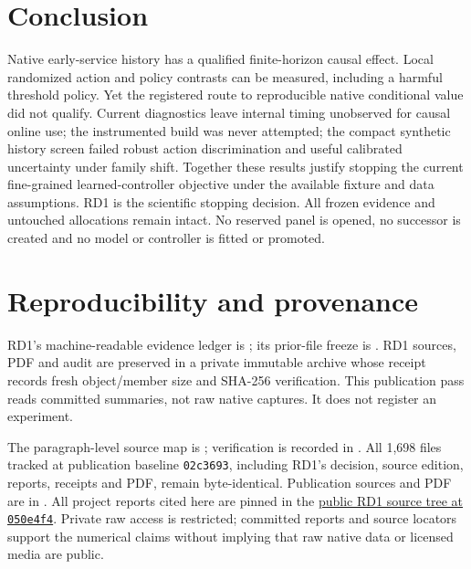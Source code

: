 \documentclass[10pt]{article}
\begin{document}
\section{Conclusion}
Native early-service history has a qualified finite-horizon causal effect.
Local randomized action and policy contrasts can be measured, including a
harmful threshold policy. Yet the registered route to reproducible native
conditional value did not qualify. Current diagnostics leave internal timing
unobserved for causal online use; the instrumented build was never attempted;
the compact synthetic history screen failed robust action discrimination and
useful calibrated uncertainty under family shift. Together these results justify
stopping the current fine-grained learned-controller objective under the
available fixture and data assumptions. RD1 is the scientific stopping decision.
All frozen evidence and untouched allocations remain intact. No reserved panel
is opened, no successor is created and no model or controller is fitted or promoted.

\appendix
\section{Reproducibility and provenance}
RD1's machine-readable evidence ledger is
; its prior-file freeze is
. RD1 sources, PDF and
audit are preserved in a private immutable archive whose receipt records fresh
object/member size and SHA-256 verification. This publication pass reads
committed summaries, not raw native captures. It does not register an experiment.

The paragraph-level source map is
; verification is
recorded in . All 1,698 files
tracked at publication baseline \texttt{02c3693}, including RD1's decision,
source edition, reports, receipts and PDF, remain byte-identical. Publication
sources and PDF are in . All project
reports cited here are pinned in the
\href{https://github.com/p-yan-6908/networkRLCD/tree/050e4f4be9b5135628cffb82e08821bbed143786}{public RD1 source tree at \texttt{050e4f4}}.
Private raw
access is restricted; committed reports and source locators support the numerical
claims without implying that raw native data or licensed media are public.


\end{document}
